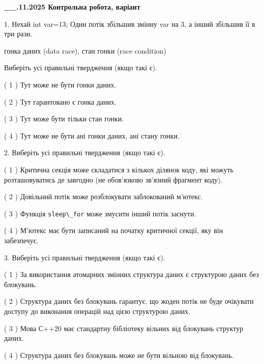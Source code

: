 \documentclass[12pt, ukrainian]{article}
\def\code#1{\Verb!#1!}
\begin{document}
\newpage
\begin {large}

\textbf{\_\_.11.2025 Контрольна робота, варіант  }\par


{
1. Нехай int var=13; Один потік збільшив змінну var на 3, а інший збільшив її в три рази.

гонка даних (data race), стан гонки (race condition)

Виберіть усі правильні твердження (якщо такі є).\par
\vspace{2mm}
( 1 ) Тут може не бути гонки даних.%

( 2 ) Тут гарантовано є гонка даних.%

( 3 ) Тут може бути тільки стан гонки.%

( 4 ) Тут може не бути ані гонки даних, ані стану гонки.%


2. Виберіть усі правильні твердження (якщо такі є).\par
\vspace{2mm}

( 1 ) Критична секція може складатися з кількох ділянок коду, які можуть розташовуватись де завгодно (не обов’язково зв’язний фрагмент коду).%

( 2 ) Довільний потік може розблокувати заблокований м’ютекс.%

( 3 ) Функція \code{sleep\_for} може змусити інший потік заснути.%

( 4 ) М’ютекс має бути записаний на початку критичної секції, яку він забезпечує.%


3. Виберіть усі правильні твердження (якщо такі є).\par
\vspace{2mm}

( 1 ) За використання атомарних змінних структура даних є структурою даних без блокувань.%

( 2 ) Структура даних без блокувань гарантує, що жоден потік не буде очікувати доступу до виконання операцій над цією структурою даних.%

( 3 ) Мова С++20 має стандартну бібліотеку вільних від блокувань структур даних.%

( 4 ) Структура даних без блокувань може не бути вільною від блокувань.%


}
\end{large}
\end{document}
